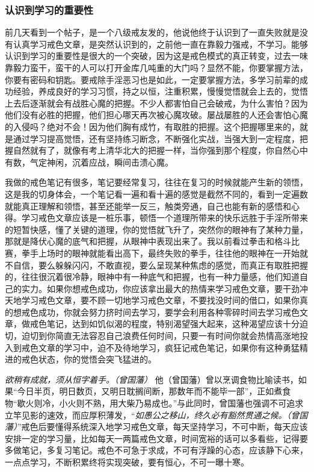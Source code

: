 \subsubsection{认识到学习的重要性}

前几天看到一个帖子，是一个八级戒友发的，他说他终于认识到了一直失败就是没有认真学习戒色文章，是突然认识到的，之前他一直在靠毅力强戒，不学习。能够认识到学习的重要性是很大的一个突破，因为这是戒色模式的真正转变，过去一味靠毅力蛮干，蛮干的人可以打开金库几吨重的大门吗？显然不能，你要掌握方法，你要有密码和钥匙。要戒除手淫恶习也是如此，一定要掌握方法，多学习前辈的成功经验，养成良好的学习习惯，持之以恒，注重积累，慢慢觉悟就会上去的，觉悟上去后逐渐就会有战胜心魔的把握。不少人都害怕自己会破戒，为什么害怕？因为他们没有必胜的把握，他们担心哪天再次被心魔攻破。屡战屡胜的人还会害怕心魔的入侵吗？绝对不会！因为他们胸有成竹，有取胜的把握。这个把握哪里来的，就是通过学习提高觉悟，还有坚持练习断念，不断强化实战，当强大到一定程度，把握自然就有了，就像有考上清华北大的把握一样，当你强到那个程度，你自然心中有数，气定神闲，沉着应战，瞬间击溃心魔。

我做的戒色笔记有很多，笔记要经常复习，往往在复习的时候就能产生新的领悟，这是我的切身体会，一个笔记看一遍和看十遍的感觉是截然不同的，看到一定遍数就能真正理解和领悟，甚至还能举一反三，触类旁通，自己也能有新的感悟和心得。学习戒色文章应该是一桩乐事，顿悟一个道理所带来的快乐远胜于手淫所带来的短暂快感，懂了关键的道理，你的觉悟就飞升了，突然你的眼神有了某种力量，那就是降伏心魔的底气和把握，从眼神中表现出来了。我以前看过拳击和格斗比赛，拳手上场时的眼神就能看出高下，最终失败的拳手，往往他的眼神在一开始就不自信，要么躲躲闪闪，不敢直视，要么呈现某种焦虑的感觉，而真正有取胜把握的，往往很沉着很冷静，眼神中有一种底气和把握，也有一种力量感，他们知道自己的实力。如果你想戒色成功，你应该拿出最大的热情来学习戒色文章，要干劲冲天地学习戒色文章，要不顾一切地学习戒色文章，不要找没时间的借口，如果你真的想戒色成功，你就会努力挤时间去学习，要学会利用各种零碎时间去学习戒色文章，做戒色笔记，达到如饥似渴的程度，特别渴望强大起来，这种渴望应该十分迫切，迫切到你简直无法容忍自己浪费任何时间，只要一有时间你就会热情高涨地投入到戒色文章的学习中，迫不及待地学习，疯狂记戒色笔记，如果你有这种勇猛精进的戒色状态，你的觉悟会突飞猛进的。

\textit{欲稍有成就，须从恒字着手。（曾国藩）} 他（曾国藩）曾以烹调食物比喻读书，如果“今日半页，明日数页，又明日耽搁间断，那数年而不能毕一部”，正如煮食物“歇火则冷，小火则不熟，用大柴乃易成也。”与此同时，曾国藩也强调不可追求立竿见影的速效，而应厚积薄发，“\textit{如愚公之移山，终久必有豁然贯通之候。（曾国藩）}”戒色后要懂得系统深入地学习戒色文章，每天坚持学习，不可中断，每天应该安排一定的学习量，比如每天一两篇戒色文章，时间宽裕的话可以多看些，记得要多做笔记，多复习笔记。戒色不可急于求成，不可有浮躁的心态，应该静下心来，一点点学习，不断积累终将实现突破，要有恒心，不可一曝十寒。

